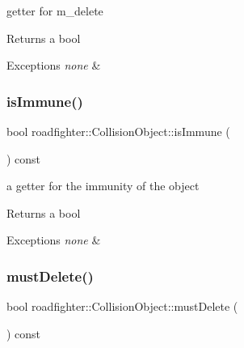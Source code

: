 getter for m\+\_\+delete \begin{DoxyReturn}{Returns}
a bool 
\end{DoxyReturn}

\begin{DoxyExceptions}{Exceptions}
{\em none} & \\
\hline
\end{DoxyExceptions}
\mbox{\label{classroadfighter_1_1CollisionObject_a4e5e9b3749d6506ad037118f1ead8c53}} 
\subsubsection{\texorpdfstring{is\+Immune()}{isImmune()}}
{\footnotesize\ttfamily bool roadfighter\+::\+Collision\+Object\+::is\+Immune (\begin{DoxyParamCaption}{ }\end{DoxyParamCaption}) const}

a getter for the immunity of the object \begin{DoxyReturn}{Returns}
a bool 
\end{DoxyReturn}

\begin{DoxyExceptions}{Exceptions}
{\em none} & \\
\hline
\end{DoxyExceptions}
\mbox{\label{classroadfighter_1_1CollisionObject_a738071cd7b1b8cd4c8d455b5e552bd4c}} 
\subsubsection{\texorpdfstring{must\+Delete()}{mustDelete()}}
{\footnotesize\ttfamily bool roadfighter\+::\+Collision\+Object\+::must\+Delete (\begin{DoxyParamCaption}{ }\end{DoxyParamCaption}) const\hspace{0.3cm}{\ttfamily [virtual]}}

